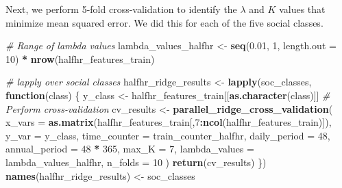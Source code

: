 \documentclass[
]{article}
\newenvironment{Shaded}{\begin{snugshade}}{\end{snugshade}}
\newcommand{\AttributeTok}[1]{\textcolor[rgb]{0.13,0.29,0.53}{#1}}
\newcommand{\CommentTok}[1]{\textcolor[rgb]{0.56,0.35,0.01}{\textit{#1}}}
\newcommand{\ControlFlowTok}[1]{\textcolor[rgb]{0.13,0.29,0.53}{\textbf{#1}}}
\newcommand{\DecValTok}[1]{\textcolor[rgb]{0.00,0.00,0.81}{#1}}
\newcommand{\FloatTok}[1]{\textcolor[rgb]{0.00,0.00,0.81}{#1}}
\newcommand{\FunctionTok}[1]{\textcolor[rgb]{0.13,0.29,0.53}{\textbf{#1}}}
\newcommand{\NormalTok}[1]{#1}
\newcommand{\OtherTok}[1]{\textcolor[rgb]{0.56,0.35,0.01}{#1}}
\newcommand{\SpecialCharTok}[1]{\textcolor[rgb]{0.81,0.36,0.00}{\textbf{#1}}}
\begin{document}
Next, we perform 5-fold cross-validation to identify the \(\lambda\) and
\(K\) values that minimize mean squared error. We did this for each of
the five social classes.

\begin{Shaded}
\begin{Highlighting}[]
\CommentTok{\# Range of lambda values}
\NormalTok{lambda\_values\_halfhr }\OtherTok{\textless{}{-}} \FunctionTok{seq}\NormalTok{(}\FloatTok{0.01}\NormalTok{, }\DecValTok{1}\NormalTok{, }\AttributeTok{length.out =} \DecValTok{10}\NormalTok{) }\SpecialCharTok{*} \FunctionTok{nrow}\NormalTok{(halfhr\_features\_train)}

\CommentTok{\# lapply over social classes}
\NormalTok{halfhr\_ridge\_results }\OtherTok{\textless{}{-}} \FunctionTok{lapply}\NormalTok{(soc\_classes, }\ControlFlowTok{function}\NormalTok{(class) \{}
\NormalTok{  y\_class }\OtherTok{\textless{}{-}}\NormalTok{ halfhr\_features\_train[[}\FunctionTok{as.character}\NormalTok{(class)]]}
  \CommentTok{\# Perform cross{-}validation}
\NormalTok{  cv\_results }\OtherTok{\textless{}{-}} \FunctionTok{parallel\_ridge\_cross\_validation}\NormalTok{(}
    \AttributeTok{x\_vars =} \FunctionTok{as.matrix}\NormalTok{(halfhr\_features\_train[,}\DecValTok{7}\SpecialCharTok{:}\FunctionTok{ncol}\NormalTok{(halfhr\_features\_train)]),}
    \AttributeTok{y\_var =}\NormalTok{ y\_class,}
    \AttributeTok{time\_counter =}\NormalTok{ train\_counter\_halfhr,}
    \AttributeTok{daily\_period =} \DecValTok{48}\NormalTok{,}
    \AttributeTok{annual\_period =} \DecValTok{48} \SpecialCharTok{*} \DecValTok{365}\NormalTok{,}
    \AttributeTok{max\_K =} \DecValTok{7}\NormalTok{,}
    \AttributeTok{lambda\_values =}\NormalTok{ lambda\_values\_halfhr,}
    \AttributeTok{n\_folds =} \DecValTok{10}
\NormalTok{  )}
  \FunctionTok{return}\NormalTok{(cv\_results)}
\NormalTok{\})}
\FunctionTok{names}\NormalTok{(halfhr\_ridge\_results) }\OtherTok{\textless{}{-}}\NormalTok{ soc\_classes}


\end{Highlighting}
\end{Shaded}
\end{document}
